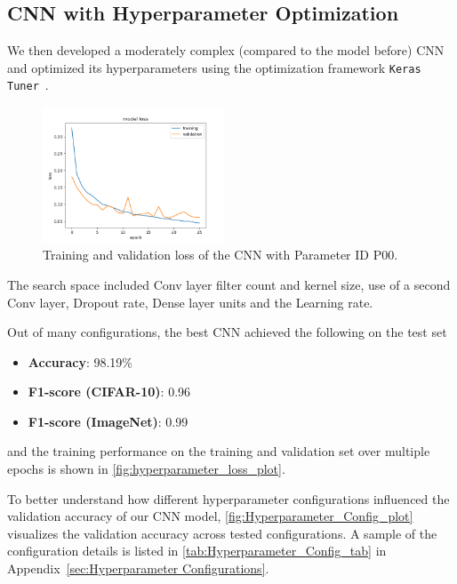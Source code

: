 \newpage
\subsection{CNN with Hyperparameter Optimization}
We then developed a moderately complex (compared to the model before) CNN and optimized its hyperparameters using the optimization framework \texttt{Keras Tuner}~\cite{omalley2019kerastuner}. 

\setlength\intextsep{0pt}
\begin{figure}
    \begin{center}
        \vspace{-\baselineskip}
        \includegraphics[width =0.48\textwidth]{Plots/ModelsAndResults/Hyperparameter_search_Loss.png}
        \caption{Training and validation loss of the CNN with Parameter ID P00.}
        \label{fig:hyperparameter_loss_plot}
    \end{center}
\end{figure}

The search space included Conv layer filter count and kernel size, use of a second Conv layer, Dropout rate, Dense layer units and the Learning rate.

Out of many configurations, the best CNN achieved the following on the test set
\begin{itemize}
    \item \textbf{Accuracy}: 98.19\%
    \item \textbf{F1-score (CIFAR-10)}: 0.96
    \item \textbf{F1-score (ImageNet)}: 0.99
\end{itemize}
and the training performance on the training and validation set over multiple epochs is shown in \autoref{fig:hyperparameter_loss_plot}.

To better understand how different hyperparameter configurations influenced the validation accuracy of our CNN model, 
\autoref{fig:Hyperparameter_Config_plot} visualizes the validation accuracy across tested configurations.
A sample of the configuration details is listed in \autoref{tab:Hyperparameter_Config_tab} in Appendix~\ref{sec:Hyperparameter Configurations}.

